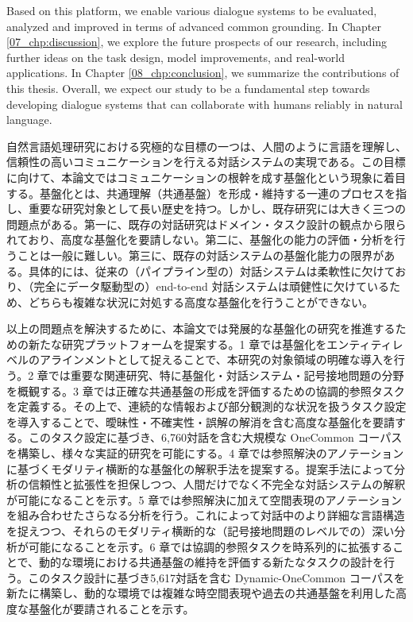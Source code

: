 \documentclass[doctor,11pt,final]{iscs-thesis}
\begin{document}
\begin{eabstract}
\begin{spacing}{1.1}
{\indent Based on this platform, we enable various dialogue systems to be evaluated, analyzed and improved in terms of advanced common grounding. In Chapter \ref{07_chp:discussion}, we explore the future prospects of our research, including further ideas on the task design, model improvements, and real-world applications. In Chapter \ref{08_chp:conclusion}, we summarize the contributions of this thesis. Overall, we expect our study to be a fundamental step towards developing dialogue systems that can collaborate with humans reliably in natural language.
}
\end{spacing}

\end{eabstract}

\begin{jabstract}
自然言語処理研究における究極的な目標の一つは、人間のように言語を理解し、信頼性の高いコミュニケーションを行える対話システムの実現である。この目標に向けて、本論文ではコミュニケーションの根幹を成す基盤化という現象に着目する。基盤化とは、共通理解（共通基盤）を形成・維持する一連のプロセスを指し、重要な研究対象として長い歴史を持つ。しかし、既存研究には大きく三つの問題点がある。第一に、既存の対話研究はドメイン・タスク設計の観点から限られており、高度な基盤化を要請しない。第二に、基盤化の能力の評価・分析を行うことは一般に難しい。第三に、既存の対話システムの基盤化能力の限界がある。具体的には、従来の（パイプライン型の）対話システムは柔軟性に欠けており、（完全にデータ駆動型の）end-to-end 対話システムは頑健性に欠けているため、どちらも複雑な状況に対処する高度な基盤化を行うことができない。

以上の問題点を解決するために、本論文では発展的な基盤化の研究を推進するための新たな研究プラットフォームを提案する。1 章では基盤化をエンティティレベルのアラインメントとして捉えることで、本研究の対象領域の明確な導入を行う。2 章では重要な関連研究、特に基盤化・対話システム・記号接地問題の分野を概観する。3 章では正確な共通基盤の形成を評価するための協調的参照タスクを定義する。その上で、連続的な情報および部分観測的な状況を扱うタスク設定を導入することで、曖昧性・不確実性・誤解の解消を含む高度な基盤化を要請する。このタスク設定に基づき、6,760対話を含む大規模な OneCommon コーパスを構築し、様々な実証的研究を可能にする。4 章では参照解決のアノテーションに基づくモダリティ横断的な基盤化の解釈手法を提案する。提案手法によって分析の信頼性と拡張性を担保しつつ、人間だけでなく不完全な対話システムの解釈が可能になることを示す。5 章では参照解決に加えて空間表現のアノテーションを組み合わせたさらなる分析を行う。これによって対話中のより詳細な言語構造を捉えつつ、それらのモダリティ横断的な（記号接地問題のレベルでの）深い分析が可能になることを示す。6 章では協調的参照タスクを時系列的に拡張することで、動的な環境における共通基盤の維持を評価する新たなタスクの設計を行う。このタスク設計に基づき5,617対話を含む Dynamic-OneCommon コーパスを新たに構築し、動的な環境では複雑な時空間表現や過去の共通基盤を利用した高度な基盤化が要請されることを示す。


\end{jabstract}
\end{document}
